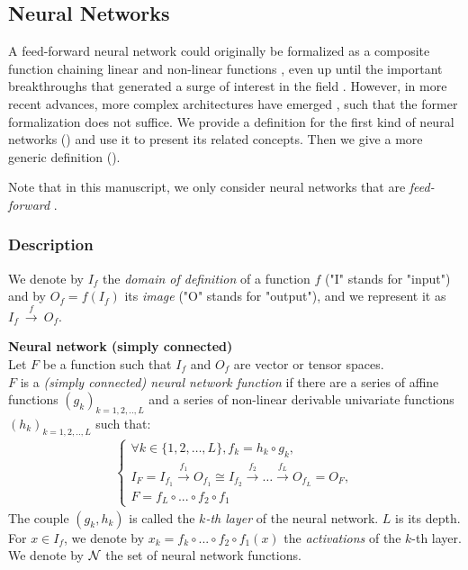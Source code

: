\subsection{Neural Networks}

A feed-forward neural network could originally be formalized as a composite function chaining linear and non-linear functions \citep{rumelhart1985learning,lecun1989backpropagation,lecun1995convolutional}, even up until the important breakthroughs that generated a surge of interest in the field \citep{hinton2012deep,krizhevsky2012imagenet,simonyan2014very}. However, in more recent advances, more complex architectures have emerged \citep{szegedy2015going,he2016deep,zoph2016neural,huang2017densely}, such that the former formalization does not suffice. We provide a definition for the first kind of neural networks () and use it to present its related concepts. Then we give a more generic definition ().

Note that in this manuscript, we only consider neural networks that are \emph{feed-forward} \citep{zell1994simulation, wiki:fnn}.

\subsubsection{Description}

We denote by $I_f$ the \textit{domain of definition} of a function $f$ ("I" stands for "input") and by $O_f = f(I_f)$ its \textit{image} ("O" stands for "output"), and we represent it as $I_f~\xrightarrow{f}~O_f$.


\begin{definition}\textbf{Neural network (simply connected)}\\
Let $F$ be a function such that $I_f$ and $O_f$ are vector or tensor spaces.\\
$F$ is a \emph{(simply connected) neural network function} if there are a series of affine functions $(g_k)_{k=1,2,..,L}$ and a series of non-linear derivable univariate functions $(h_k)_{k=1,2,..,L}$ such that:
\begin{gather*}
\left\{
  \begin{array}{l}
    \forall k \in \{1, 2, \ldots, L\}, f_k = h_k \circ g_k, \\
    I_F = I_{f_1} \xrightarrow{f_1} O_{f_1} \cong I_{f_2} \xrightarrow{f_2} \dots \xrightarrow{f_L} O_{f_L} = O_F, \\
    F = f_{L} \circ ... \circ f_{2} \circ f_1
  \end{array}
\right.
\end{gather*}
The couple $(g_k, h_k)$ is called the \emph{$k$-th layer} of the neural network. $L$ is its depth.
For $x \in I_f$, we denote by $x_k = f_k \circ ... \circ f_{2} \circ f_1 (x)$ the \emph{activations} of the $k$-th layer. We denote by $\mathcal{N}$ the set of neural network functions.
\label{def:nn}
\end{definition}

